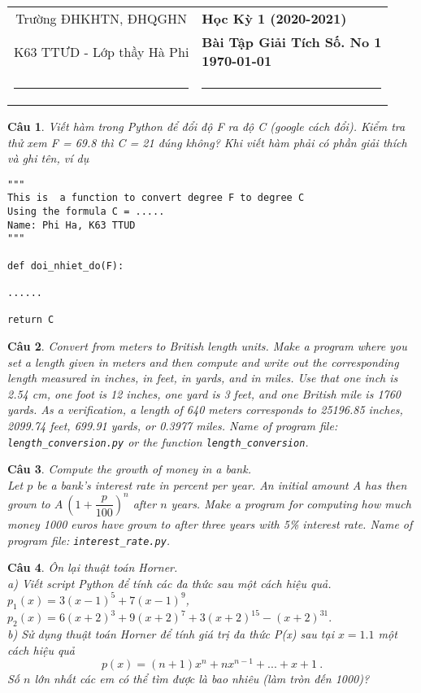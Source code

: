 \documentclass[answers]{exam}
\newtheorem{bt}{Câu}
\begin{document}
\begin{tabular*}
{\linewidth}{c>{\centering\hspace{0pt}} p{}}
Trường ĐHKHTN, ĐHQGHN & {\bf Học Kỳ 1 (2020-2021)}
\tabularnewline
{K63 TTƯD - Lớp thầy Hà Phi} & {\bf Bài Tập Giải Tích Số. No 1 \\ \today}
\tabularnewline
\rule{1in}{1pt}  \small  & \rule{2in}{1pt} %
\tabularnewline

\end{tabular*}
%
\printanswers

\begin{bt}\label{bt1}
Viết hàm trong Python để đổi độ F ra độ C (google cách đổi). Kiểm tra thử xem F = 69.8 thì C = 21 đúng không?
Khi viết hàm phải có phần giải thích và ghi tên, ví dụ
%
\begin{lstlisting}[frame=single] 
"""
This is  a function to convert degree F to degree C
Using the formula C = .....
Name: Phi Ha, K63 TTUD
"""

def doi_nhiet_do(F):

......

return C
\end{lstlisting}
%
\end{bt}

\begin{bt}
Convert from meters to British length units. Make a program where you set a length given in meters and then
compute and write out the corresponding length measured in inches, in feet, in yards, and in miles. Use that one inch is 2.54 cm, one foot is
12 inches, one yard is 3 feet, and one British mile is 1760 yards. As a verification, a length of 640 meters corresponds to 25196.85 inches,
2099.74 feet, 699.91 yards, or 0.3977 miles. Name of program file: \verb|length_conversion.py| or the function \verb|length_conversion|. 
\end{bt}


\begin{bt} Compute the growth of money in a bank. \\
Let $p$ be a bank’s interest rate in percent per year. An initial amount A has then grown to $A \ \left(1 + \dfrac{p}{100}\right)^n$
after $n$ years. Make a program for computing how much money 1000 euros have grown to after three years with 5\% interest rate. Name of
program file: \verb|interest_rate.py|. 
\end{bt}

\begin{bt} Ôn lại thuật toán Horner. \\
a) Viết script Python để tính các đa thức sau một cách hiệu quả.
$p_1(x) = 3(x-1)^5+7(x-1)^9$, \quad $p_2(x) = 6(x+2)^3 + 9(x+2)^7 + 3 (x+2)^{15} - (x+2)^{31}.$	 \\
b) Sử dụng thuật toán Horner để tính giá trị đa thức P(x) sau tại $x = 1.1$ một cách hiệu quả
%
\[
p(x) = (n+1) x^n + n x^{n-1} + ... + x + 1 \ .
\]
%
Số $n$ lớn nhất các em có thể tìm được là bao nhiêu (làm tròn đến 1000)? 
\end{bt}
\end{document}
